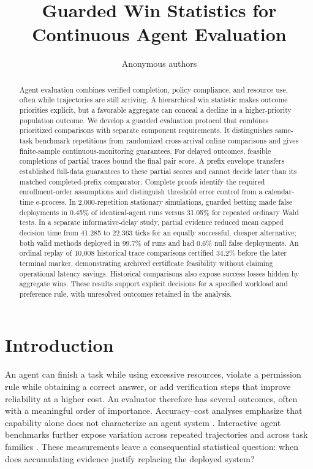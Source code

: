 \documentclass{article}
\title{Guarded Win Statistics for Continuous Agent Evaluation}
\author{Anonymous authors}
\begin{document}
\maketitle

\begin{abstract}
Agent evaluation combines verified completion, policy compliance, and
resource use, often while trajectories are still arriving. A hierarchical
win statistic makes outcome priorities explicit, but a favorable
aggregate can conceal a decline in a higher-priority population outcome.
We develop a guarded evaluation protocol that combines prioritized
comparisons with separate component requirements. It distinguishes
same-task benchmark repetitions from randomized cross-arrival online
comparisons and gives finite-sample continuous-monitoring guarantees.
For delayed outcomes, feasible completions of partial traces bound the
final pair score. A prefix envelope transfers established full-data
guarantees to these partial scores and cannot decide later than its
matched completed-prefix comparator. Complete proofs identify the
required enrollment-order assumptions and distinguish threshold error
control from a calendar-time e-process. In 2,000-repetition stationary
simulations, guarded betting made false deployments in 0.45\% of
identical-agent runs versus 31.05\% for repeated ordinary Wald tests.
In a separate informative-delay study, partial evidence reduced mean
capped decision time from 41.285 to 22.363 ticks for an equally successful,
cheaper alternative; both valid methods deployed in 99.7\% of runs and
had 0.6\% null false deployments. An ordinal replay of 10,008
historical trace comparisons certified 34.2\% before the later terminal
marker, demonstrating archived certificate feasibility without claiming operational
latency savings. Historical comparisons also expose success losses
hidden by aggregate wins. These
results support explicit decisions for a specified workload and
preference rule, with unresolved outcomes retained in the analysis.
\end{abstract}

\section{Introduction}
An agent can finish a task while using excessive resources, violate a
permission rule while obtaining a correct answer, or add verification
steps that improve reliability at a higher cost. An evaluator therefore
has several outcomes, often with a meaningful order of importance.
Accuracy--cost analyses emphasize that capability alone does not
characterize an agent system \citep{kapoor2024agents}. Interactive agent
benchmarks further expose variation across repeated trajectories and
across task families \citep{tau2bench2025,sweagent2024}. These measurements
leave a consequential statistical question: when does accumulating
evidence justify replacing the deployed system?
\end{document}
